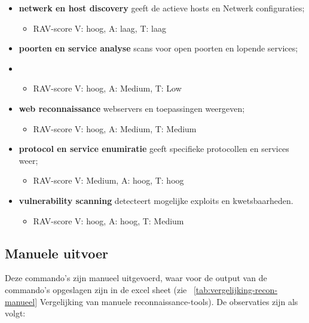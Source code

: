 \begin{itemize}
  \item \textbf{netwerk en host discovery} geeft de actieve hosts en Netwerk configuraties;
    {\scriptsize \begin{itemize}
      \item \textmd{RAV-score} V: hoog, A: laag, T: laag
    \end{itemize} }
  \item \textbf{poorten en service analyse} scans voor open poorten en lopende services;
    \item {\scriptsize \begin{itemize}
      \item \textmd{RAV-score} V: hoog, A: Medium, T: Low
    \end{itemize} }
  \item \textbf{web reconnaissance} webservers en toepassingen weergeven;
    {\scriptsize \begin{itemize}
      \item \textmd{RAV-score} V: hoog, A: Medium, T: Medium
    \end{itemize} }
  \item \textbf{protocol en service enumiratie} geeft specifieke protocollen en services weer;
  {\scriptsize \begin{itemize}
    \item \textmd{RAV-score} V: Medium, A: hoog, T: hoog
  \end{itemize} }
  \item \textbf{vulnerability scanning} detecteert mogelijke exploits en kwetsbaarheden.
  {\scriptsize \begin{itemize}
    \item \textmd{RAV-score} V: hoog, A: hoog, T: Medium
  \end{itemize} }
\end{itemize}
  
\subsection{Manuele uitvoer}
Deze commando's zijn manueel uitgevoerd, waar voor de output van de commando's opgeslagen zijn in de excel sheet (zie ~\ref{tab:vergelijking-recon-manueel} Vergelijking van manuele reconnaissance-tools).
De observaties zijn als volgt:

